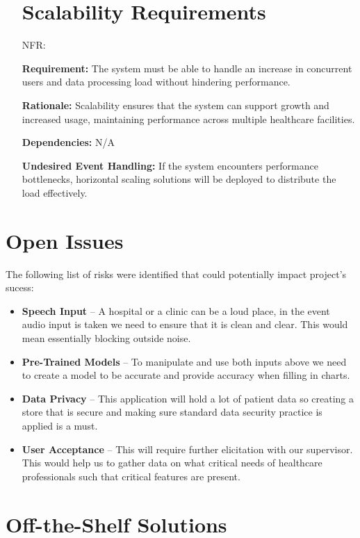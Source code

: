 \documentclass[12pt]{article}
\newcounter{nfrnum} %
\begin{document}
\begin{itemize}
\section{Scalability Requirements}

\item[NFR\refstepcounter{nfrnum}\thenfrnum \label{NFR_Scalability}:]

\textbf{Requirement:} The system must be able to handle an increase in concurrent users and data processing load without hindering performance.

\textbf{Rationale:} Scalability ensures that the system can support growth and increased usage, maintaining performance across multiple healthcare facilities.  

\textbf{Dependencies:} N/A

\textbf{Undesired Event Handling:} If the system encounters performance bottlenecks, horizontal scaling solutions will be deployed to distribute the load effectively.

\end{itemize}


\section{Open Issues}

The following list of risks were identified that could potentially impact project's sucess:
\begin{itemize}
  \item \textbf{Speech Input} -- A hospital or a clinic can be a loud place, in the event audio input is taken we need to ensure that it is clean and clear. This would mean essentially blocking outside noise. 
  \item \textbf{Pre-Trained Models} -- To manipulate and use both inputs above we need to create a model to be accurate and provide accuracy when filling in charts. 
  \item \textbf{Data Privacy} -- This application will hold a lot of patient data so creating a store that is secure and making sure standard data security practice is applied is a must.
  \item \textbf{User Acceptance} -- This will require further elicitation with our supervisor. This would help us to gather data on what critical needs of healthcare professionals such that critical features are present. 
\end{itemize}

\section{Off-the-Shelf Solutions}
\end{document}

